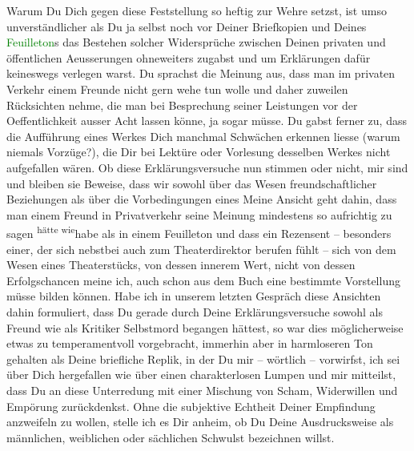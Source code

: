 \pstart
           Warum Du Dich gegen diese Feststellung so heftig zur Wehre setzst, ist umso
               unverständlicher als Du ja selbst noch vor \label{T_L03521-1v}\label{T_L03521-1h} Deiner Briefkopien und Deines
                  \textcolor{green}{Feuilleton}{}\ledrightnote{{$\rightarrow$}\textcolor{green}{Berliner Theater. (»Lebendige Stunden« von Arthur Schnitzler.)}}s das Bestehen
               solcher Widersprüche zwischen Deinen privaten und öffentlichen Aeusserungen
               ohneweiters zugabst und um Erklärungen dafür keineswegs verlegen warst. Du sprachst
               die Meinung aus, dass man im privaten Verkehr einem Freunde nicht gern wehe tun wolle
               und daher zuweilen Rücksichten nehme, die man bei Besprechung seiner Leistungen vor
               der Oeffentlichkeit ausser Acht lassen könne, ja sogar müsse. Du gabst ferner zu,
               dass die Aufführung eines Werkes Dich manchmal Schwächen erkennen liesse (warum
               niemals Vorzüge?), die Dir bei Lektüre oder Vorlesung desselben Werkes nicht
               aufgefallen wären. Ob diese Erklärungsversuche nun stimmen oder nicht, mir sind und
               bleiben sie Beweise, dass wir sowohl über das Wesen freundschaftlicher Beziehungen
               als über die Vorbedingungen eines \label{T_L03521-2v}\label{T_L03521-2h}{ }{\pb}Meine Ansicht geht dahin, dass man
               einem Freund in Privatverkehr seine Meinung mindestens so aufrichtig zu sagen \substVorne{}\textsuperscript{hätte wie}{\allowbreak}\substDazwischen{}habe als\substHinten{} in einem Feuilleton und dass ein Rezensent – besonders einer, der sich
               nebstbei auch zum Theaterdirektor berufen fühlt – sich von dem Wesen eines
               Theaterstücks, von dessen innerem Wert, nicht von dessen Erfolgschancen meine ich,
               auch schon aus dem Buch eine bestimmte Vorstellung müsse bilden können. Habe ich in
               unserem letzten Gespräch diese Ansichten dahin formuliert, dass Du gerade durch Deine
               Erklärungsversuche sowohl als Freund wie als Kritiker Selbstmord begangen hättest, so
               war dies möglicherweise  etwas zu temperamentvoll
               vorgebracht, immerhin aber in harmloseren Ton gehalten als Deine briefliche Replik,
               in der Du mir – wörtlich – vorwirfst, ich sei über Dich hergefallen wie über einen
               charakterlosen Lumpen und mir mitteilst, dass Du an diese Unterredung mit einer
               Mischung von Scham, Widerwillen und Empörung zurückdenkst. Ohne die subjektive
               Echtheit Deiner Empfindung anzweifeln zu wollen, stelle ich es Dir anheim, ob Du
               Deine Ausdrucksweise als männlichen, weiblichen oder sächlichen Schwulst bezeichnen
               willst.\pend
           
